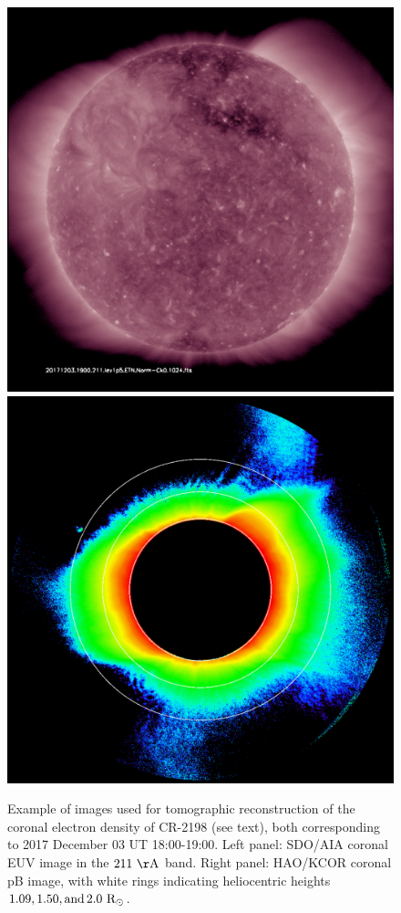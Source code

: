 
\begin{figure}[ht]
  \centering
  \includegraphics[width=0.67\columnwidth]{img_211.pdf}
  \hskip 1.5cm
  \includegraphics[width=0.67\columnwidth]{20171203_180316_kcor_l1_10min_avg_image.pdf}
  \caption{Example of images used for tomographic reconstruction of the coronal electron density of CR-2198 (see text), both corresponding to 2017 December 03 UT 18:00-19:00. Left panel: SDO/AIA coronal EUV image in the $211~\rm{\AA}$ band. Right panel: HAO/KCOR coronal pB image, with white rings indicating heliocentric heights $1.09, 1.50, \rm{and}\, 2.0~\rm{R}_\odot$.}
  \label{fig_images}
\end{figure}



